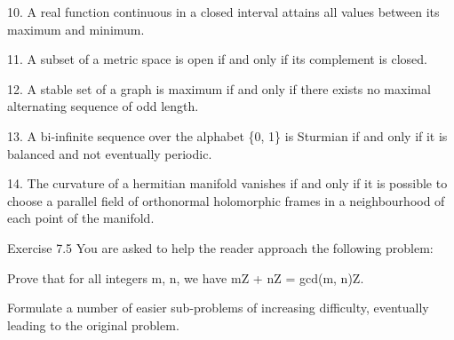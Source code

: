 \documentclass[11pt]{article}
\theoremstyle{plain}
\theoremstyle{definition}
\begin{document}
10. A real function continuous in a closed interval attains all values between its maximum and minimum.

11. A subset of a metric space is open if and only if its complement is closed.

12. A stable set of a graph is maximum if and only if there exists no maximal alternating sequence of odd length.

13. A bi-infinite sequence over the alphabet \{0, 1\} is Sturmian if and only if it is balanced and not eventually periodic.

14. The curvature of a hermitian manifold vanishes if and only if it is possible to choose a parallel field of orthonormal holomorphic frames in a neighbourhood of each point of the manifold.

Exercise 7.5 You are asked to help the reader approach the following problem:

Prove that for all integers m, n, we have mZ + nZ = gcd(m, n)Z.

Formulate a number of easier sub-problems of increasing difficulty, eventually leading to the original problem.
\end{document}
